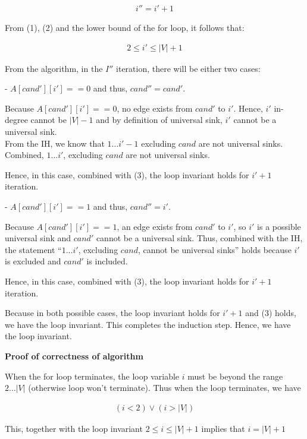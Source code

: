 \documentclass[a4paper]{report}
\begin{document}
\begin{enumerate}
      \begin{align}
        i'' = i' + 1 
      \end{align}

      From (1), (2) and the lower bound of the for loop, it follows that:

      \begin{align}
        2 \leq i' \leq |V| + 1
      \end{align}


      From the algorithm, in the $I''$ iteration, there will be either two cases:

        - $A[cand'][i'] == 0$ and thus, $cand'' = cand'$.

        Because $A[cand'][i'] == 0$, no edge exists from $cand'$ to $i'$. Hence, $i'$ in-degree cannot be $|V| - 1$ and by definition of universal sink, $i'$ cannot be a universal sink.\\
        From the IH, we know that $1 \dots i'-1$ excluding $cand$ are not universal sinks. Combined, $1 \dots i'$, excluding $cand$ are not universal sinks.

        Hence, in this case, combined with (3), the loop invariant holds for $i'+1$ iteration.

        - $A[cand'][i'] == 1$ and thus, $cand'' = i'$.

        Because $A[cand'][i'] == 1$, an edge exists from $cand'$ to $i'$, so $i'$ is a possible universal sink and $cand'$ cannot be a universal sink. 
        Thus, combined with the IH, the statement ``$1 \dots i'$, excluding $cand$, cannot be universal sinks'' holds because $i'$ is excluded and $cand'$ is included.

        Hence, in this case, combined with (3), the loop invariant holds for $i'+1$ iteration.

        Because in both possible cases, the loop invariant holds for $i'+1$ and (3) holds, we have the loop invariant. This completes the induction step. 
        Hence, we have the loop invariant.

      {\bf Proof of correctness of algorithm}

      When the for loop terminates, the loop variable $i$ must be beyond the range $ 2 \dots |V|$ (otherwise loop won't terminate).
      Thus when the loop terminates, we have

      \begin{align}
        (i < 2) \vee (i > |V|)
      \end{align}

      This, together with the loop invariant $2 \leq i \leq |V| + 1$ implies that $i = |V| + 1$
      

\end{enumerate}
\end{document}
